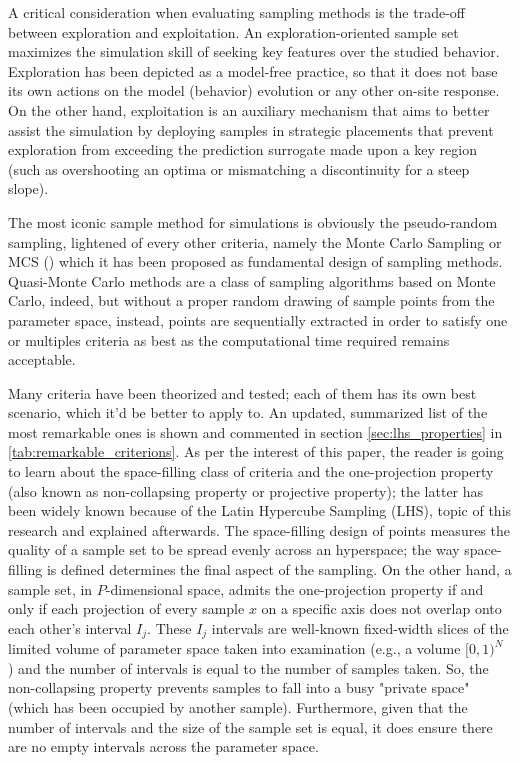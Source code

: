 \documentclass{article}
\begin{document}
A critical consideration when evaluating sampling methods is the trade-off between exploration and exploitation. An exploration-oriented sample set maximizes the simulation skill of seeking key features over the studied behavior. Exploration has been depicted as a model-free practice, so that it does not base its own actions on the model (behavior) evolution or any other on-site response. On the other hand, exploitation is an auxiliary mechanism that aims to better assist the simulation by deploying samples in strategic placements that prevent exploration from exceeding the prediction surrogate made upon a key region (such as overshooting an optima or mismatching a discontinuity for a steep slope).

The most iconic sample method for simulations is obviously the pseudo-random sampling, lightened of every other criteria, namely the Monte Carlo Sampling or MCS ()  which it has been proposed as fundamental design of sampling methods. Quasi-Monte Carlo methods are a class of sampling algorithms based on Monte Carlo, indeed, but without a proper random drawing of sample points from the parameter space, instead, points are sequentially extracted in order to satisfy one or multiples criteria as best as the computational time required remains acceptable.
 
Many criteria have been theorized and tested; each of them has its own best scenario, which it'd be better to apply to. An updated, summarized list of the most remarkable ones is shown and commented in section \cref{sec:lhs_properties} in \cref{tab:remarkable_criterions}. As per the interest of this paper, the reader is going to learn about the space-filling class of criteria and the one-projection property (also known as non-collapsing property or projective property); the latter has been widely known because of the Latin Hypercube Sampling (LHS), topic of this research and explained afterwards. The space-filling design of points measures the quality of a sample set to be spread evenly across an hyperspace; the way space-filling is defined determines the final aspect of the sampling. On the other hand, a sample set, in $P$-dimensional space, admits the one-projection property if and only if each projection of every sample $x$ on a specific axis does not overlap onto each other's interval $I_j$. These $I_j$ intervals are well-known fixed-width slices of the limited volume of parameter space taken into examination (e.g., a volume $[0,1)^N$ ) and the number of intervals is equal to the number of samples taken. So, the non-collapsing property prevents samples to fall into a busy "private space" (which has been occupied by another sample). Furthermore, given that the number of intervals and the size of the sample set is equal, it does ensure there are no empty intervals across the parameter space.
\end{document}
